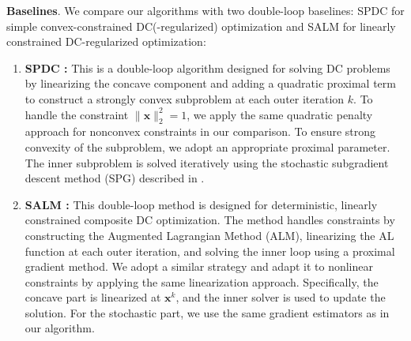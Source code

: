 \documentclass{article}
\theoremstyle{plain}
\theoremstyle{definition}
\theoremstyle{remark}
\newcommand{\bx}{\bm{x}}
\numberwithin{equation}{section}
\begin{document}
\vspace{3pt}
\noindent\textbf{Baselines}. We compare our algorithms with two double-loop baselines: SPDC \cite{xu2019stochastic,nitanda2017stochastic} for simple convex-constrained DC(-regularized) optimization and SALM \cite{sun2023algorithms} for linearly constrained DC-regularized optimization:
\begin{enumerate}
    \item[(i)] \textbf{SPDC \cite{xu2019stochastic,nitanda2017stochastic}:} This is a double-loop algorithm designed for solving DC problems by linearizing the concave component and adding a quadratic proximal term to construct a strongly convex subproblem at each outer iteration \( k \). To handle the constraint \( \|\mathbf{x}\|_2^2 = 1 \), we apply the same quadratic penalty approach for nonconvex constraints in our comparison. To ensure strong convexity of the subproblem, we adopt an appropriate proximal parameter. The inner subproblem is solved iteratively using the stochastic subgradient descent method (SPG) described in \cite{xu2019stochastic}.
    \item[(ii)] \textbf{SALM \cite{sun2023algorithms}:} This double-loop method is designed for deterministic, linearly constrained composite DC optimization. The method handles constraints by constructing the Augmented Lagrangian Method (ALM), linearizing the AL function at each outer iteration, and solving the inner loop using a proximal gradient method. We adopt a similar strategy and adapt it to nonlinear constraints by applying the same linearization approach. Specifically, the concave part is linearized at \(\bx^k\), and the inner solver is used to update the solution. For the stochastic part, we use the same gradient estimators as in our algorithm.
\end{enumerate}
\end{document}
